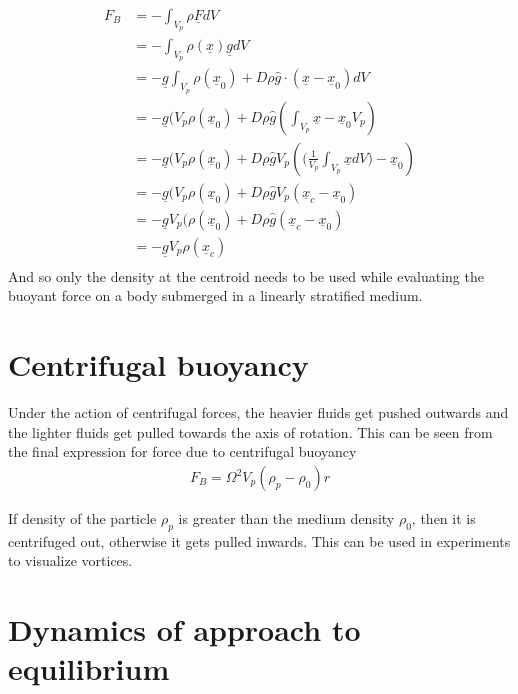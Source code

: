 \documentclass[11pt,a4paper]{article}
\newcommand{\vect}[1]{\underline{#1}}
\newcommand{\uvect}[1]{\hat{#1}}
\newcommand{\1}{\vect{1}}
\begin{document}
\begin{align*}
F_B &= -\int_{V_p}\rho \vect{F}dV \\
&= -\int_{V_p}\rho(\vect{x}) \vect{g} dV \\
&= -\vect{g}\int_{V_p}\rho(\vect x_0) + D\rho \uvect{g} \cdot (\vect x - \vect x_0) dV \\
&= -\vect{g}(V_p\rho(\vect x_0) + D\rho \uvect{g} (\int_{V_p}\vect x - \vect x_0V_p) \\
&= -\vect{g}(V_p\rho(\vect x_0) + D\rho \uvect{g}V_p (\big(\frac{1}{V_p}\int_{V_p}\vect x dV\big) - \vect x_0) \\
&= -\vect{g}(V_p\rho(\vect x_0) + D\rho \uvect{g}V_p (\vect x_c - \vect x_0) \\
&= -\vect{g}V_p(\rho(\vect x_0) + D\rho \uvect{g} (\vect x_c - \vect x_0) \\
&= -\vect{g}V_p \rho(\vect x_c) \\
\end{align*}
And so only the density at the centroid needs to be used while evaluating the buoyant force on a body submerged in a linearly stratified medium.

\section{Centrifugal buoyancy}
Under the action of centrifugal forces, the heavier fluids get pushed outwards and the lighter fluids get pulled towards the axis of rotation. This can be seen from the final expression for force due to centrifugal buoyancy
\begin{align*}
F_B = \Omega^2 V_p (\rho_p - \rho_0)r
\end{align*} 

If density of the particle $\rho_p$ is greater than the medium density $\rho_0$, then it is centrifuged out, otherwise it gets pulled inwards. This can be used in experiments to visualize vortices. 

\section{Dynamics of approach to equilibrium}
\end{document}
